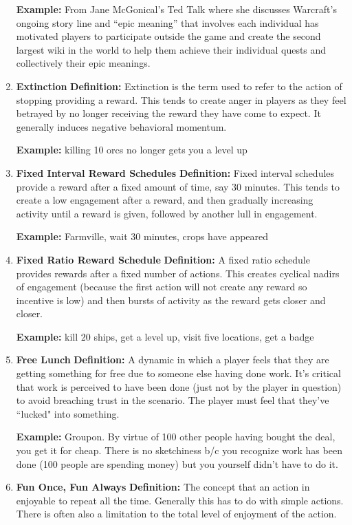 \begin{enumerate}
\textbf{Example:} From Jane McGonical’s Ted Talk where she discusses Warcraft’s ongoing story line and “epic meaning” that involves each individual has motivated players to participate outside the game and create the second largest wiki in the world to help them achieve their individual quests and collectively their epic meanings.

\item \textbf{Extinction}
\textbf{Definition:} Extinction is the term used to refer to the action of stopping providing a reward. This tends to create anger in players as they feel betrayed by no longer receiving the reward they have come to expect. It generally induces negative behavioral momentum.

\textbf{Example:} killing 10 orcs no longer gets you a level up

\item \textbf{Fixed Interval Reward Schedules}
\textbf{Definition:} Fixed interval schedules provide a reward after a fixed amount of time, say 30 minutes. This tends to create a low engagement after a reward, and then gradually increasing activity until a reward is given, followed by another lull in engagement.

\textbf{Example:} Farmville, wait 30 minutes, crops have appeared

\item \textbf{Fixed Ratio Reward Schedule}
\textbf{Definition:} A fixed ratio schedule provides rewards after a fixed number of actions. This creates cyclical nadirs of engagement (because the first action will not create any reward so incentive is low) and then bursts of activity as the reward gets closer and closer.

\textbf{Example:} kill 20 ships, get a level up, visit five locations, get a badge

\item \textbf{Free Lunch}
\textbf{Definition:} A dynamic in which a player feels that they are getting something for free due to someone else having done work. It’s critical that work is perceived to have been done (just not by the player in question) to avoid breaching trust in the scenario. The player must feel that they’ve ``lucked" into something.

\textbf{Example:} Groupon. By virtue of 100 other people having bought the deal, you get it for cheap. There is no sketchiness b/c you recognize work has been done (100 people are spending money) but you yourself didn’t have to do it.

\item \textbf{Fun Once, Fun Always}
\textbf{Definition:} The concept that an action in enjoyable to repeat all the time. Generally this has to do with simple actions. There is often also a limitation to the total level of enjoyment of the action.


\end{enumerate}
